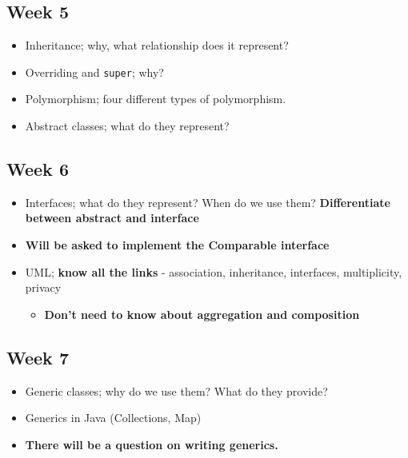 \documentclass[]{article}
\providecommand{\tightlist}{%
  \setlength{\itemsep}{0pt}\setlength{\parskip}{0pt}}
\begin{document}
\hypertarget{week-5}{%
\subsection{Week 5}\label{week-5}}

\begin{itemize}
\tightlist
\item
  Inheritance; why, what relationship does it represent?
\item
  Overriding and \texttt{super}; why?
\item
  Polymorphism; four different types of polymorphism.
\item
  Abstract classes; what do they represent?
\end{itemize}

\hypertarget{week-6}{%
\subsection{Week 6}\label{week-6}}

\begin{itemize}
\item
  Interfaces; what do they represent? When do we use them?
  \textbf{Differentiate between abstract and interface}
\item
  \textbf{Will be asked to implement the Comparable interface}
\item
  UML; \textbf{know all the links} - association, inheritance,
  interfaces, multiplicity, privacy

  \begin{itemize}
  \tightlist
  \item
    \textbf{Don't need to know about aggregation and composition}
  \end{itemize}
\end{itemize}

\hypertarget{week-7}{%
\subsection{Week 7}\label{week-7}}

\begin{itemize}
\tightlist
\item
  Generic classes; why do we use them? What do they provide?
\item
  Generics in Java (Collections, Map)
\item
  \textbf{There will be a question on writing generics.}
\end{itemize}
\end{document}
